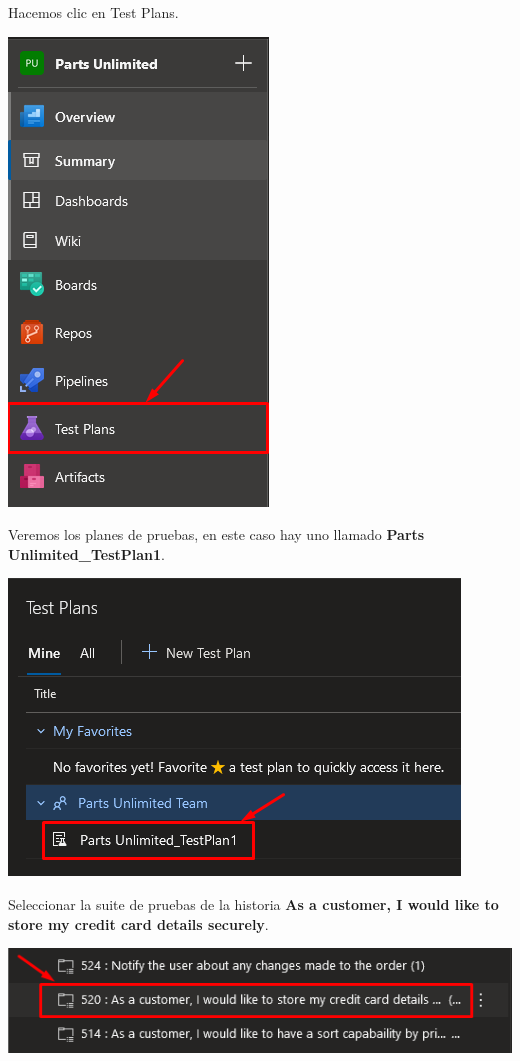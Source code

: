 \documentclass{elsarticle}
\begin{document}
Hacemos clic en Test Plans.
\begin{center}
	\includegraphics{img/Screenshot_17.png}
\end{center}

Veremos los planes de pruebas, en este caso hay uno llamado \textbf{Parts Unlimited\_TestPlan1}.
\begin{center}
	\includegraphics{img/Screenshot_18.png}
\end{center}

Seleccionar la suite de pruebas de la historia \textbf{As a customer, I would like to store my credit card details securely}.
\begin{center}
	\includegraphics[width=\columnwidth]{img/Screenshot_19.png}
\end{center}
\end{document}
